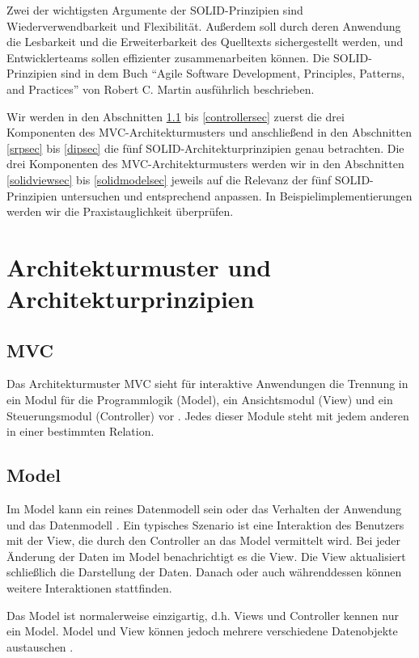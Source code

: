 \documentclass{vldb}
\begin{document}
Zwei der wichtigsten Argumente der SOLID-Prinzipien sind Wiederverwendbarkeit und Flexibilität. Außerdem soll durch deren Anwendung die Lesbarkeit und die Erweiterbarkeit des Quelltexts sichergestellt werden, und Entwicklerteams sollen effizienter zusammenarbeiten können. Die SOLID-Prinzipien sind in dem Buch ``Agile Software Development, Principles, Patterns, and Practices'' von Robert C. Martin ausführlich beschrieben.

Wir werden in den Abschnitten \ref{mvcsec} bis \ref{controllersec} zuerst die drei Komponenten des MVC-Architekturmusters und anschließend in den Abschnitten \ref{srpsec} bis \ref{dipsec} die fünf SOLID-Architekturprinzipien genau betrachten. Die drei Komponenten des MVC-Architekturmusters werden wir in den Abschnitten \ref{solidviewsec} bis \ref{solidmodelsec} jeweils auf die Relevanz der fünf SOLID-Prinzipien untersuchen und ent\-sprechend anpassen. In Bei\-spiel\-implementierungen werden wir die Praxis\-taug\-lich\-keit über\-prü\-fen.

\section{Architekturmuster und\\ Architekturprinzipien}
\subsection{MVC}
\label{mvcsec}
Das Architekturmuster MVC sieht für interaktive Anwendungen die Trennung in ein Modul für die Programmlogik (Model), ein Ansichtsmodul (View) und ein Steuerungsmodul (Controller) vor \cite[S.~26-49]{KraPo88}. Jedes dieser Module steht mit jedem anderen in einer bestimmten Relation.

\subsection{Model}
Im Model kann ein reines Datenmodell sein \cite[S.~27]{KraPo88} oder das Verhalten der Anwendung und das Datenmodell \cite[S.~2]{burbeck87}. Ein typisches Szenario ist eine Interaktion des Benutzers mit der View, die durch den Controller an das Model vermittelt wird. Bei jeder Änderung der Daten im Model benachrichtigt es die View. Die View aktualisiert schließlich die Darstellung der Daten. Danach oder auch währenddessen können weitere Interaktionen stattfinden.

Das Model ist normalerweise einzigartig, d.h. Views und Controller kennen nur ein Model. Model und View können jedoch mehrere verschiedene Datenobjekte austauschen \cite[S.~14]{Reens79}.
\end{document}
